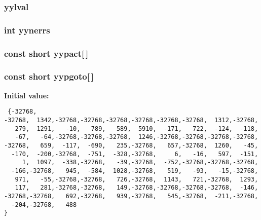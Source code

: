 \subsubsection{ yylval}\label{parser_8c_a191}


\subsubsection{\setlength{\rightskip}{0pt plus 5cm}int yynerrs}\label{parser_8c_a193}


\subsubsection{\setlength{\rightskip}{0pt plus 5cm}const short yypact[$\,$]\hspace{0.3cm}{\tt  [static]}}\label{parser_8c_a186}


\subsubsection{\setlength{\rightskip}{0pt plus 5cm}const short yypgoto[$\,$]\hspace{0.3cm}{\tt  [static]}}\label{parser_8c_a187}


{\bf Initial value:}

\footnotesize\begin{verbatim} {-32768,
-32768,  1342,-32768,-32768,-32768,-32768,-32768,-32768,  1312,-32768,
   279,  1291,   -10,   789,   589,  5910,  -171,   722,  -124,  -118,
   -67,   -64,-32768,-32768,-32768,  1246,-32768,-32768,-32768,-32768,
-32768,   659,  -117,  -690,   235,-32768,   657,-32768,  1260,   -45,
  -170,  -200,-32768,  -751,  -328,-32768,     6,   -16,   597,  -151,
     1,  1097,  -338,-32768,   -39,-32768,  -752,-32768,-32768,-32768,
  -166,-32768,   945,  -584,  1028,-32768,   519,   -93,   -15,-32768,
   971,   -55,-32768,-32768,   726,-32768,  1143,   721,-32768,  1293,
   117,   281,-32768,-32768,   149,-32768,-32768,-32768,-32768,  -146,
-32768,-32768,   692,-32768,   939,-32768,   545,-32768,  -211,-32768,
  -204,-32768,   488
}\end{verbatim}\normalsize 
{}
